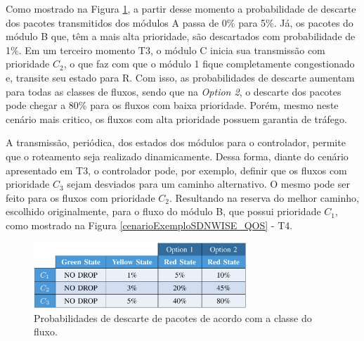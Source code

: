Como mostrado na Figura \ref{drop_prob}, a partir desse momento a probabilidade de descarte dos pacotes transmitidos dos módulos A passa de 0\% para 5\%. Já, os pacotes do módulo B que, têm a mais alta prioridade, são descartados com probabilidade de 1\%. Em um terceiro momento T3, o módulo C inicia sua transmissão com prioridade $C_2$, o que faz com que o módulo 1 fique completamente congestionado e, transite seu estado para R. Com isso, as probabilidades de descarte aumentam para todas as classes de fluxos, sendo que na \textit{Option 2}, o descarte dos pacotes pode chegar a 80\% para os fluxos com baixa prioridade. Porém, mesmo neste cenário mais critico, os fluxos com alta prioridade possuem garantia de tráfego.

A transmissão, periódica, dos estados dos módulos para o controlador, permite que o roteamento seja realizado dinamicamente. Dessa forma, diante do cenário apresentado em T3, o controlador pode, por exemplo, definir que os fluxos com prioridade $C_3$ sejam desviados para um caminho alternativo. O mesmo pode ser feito para os fluxos com prioridade $C_2$. Resultando na reserva do melhor caminho, escolhido originalmente, para o fluxo do módulo B, que possui prioridade $C_1$, como mostrado na Figura \ref{cenarioExemploSDNWISE_QOS} - T4.

\begin{figure}[!htb]
    \centering
    \includegraphics[width=8cm]{figs/drop_prob.png}
    \caption{Probabilidades de descarte de pacotes de acordo com a classe do fluxo. \cite{di2016exploiting} }
    \label{drop_prob}
\end{figure}